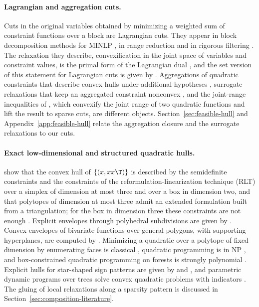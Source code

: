 \paragraph{Lagrangian and aggregation cuts.}
Cuts in the original variables obtained by minimizing a weighted sum of
constraint functions over a block are Lagrangian cuts. They appear in block
decomposition methods for MINLP \citep{Nowak2005,KaruppiahGrossmann2008,WuMutsNowakHendrix2025},
in range reduction \citep{TawarmalaniSahinidis2004,GleixnerEtAl2017} and in
rigorous filtering \citep{DomesNeumaier2016}. The relaxation they describe,
convexification in the joint space of variables and constraint values, is the
primal form of the Lagrangian dual
\citep{Falk1969,Geoffrion1974,FeltenmarkKiwiel2000,LemarechalRenaud2001}, and
the set version of this statement for Lagrangian cuts is given by
\citet{ChenLuedtke2022}. Aggregations of quadratic constraints that describe
convex hulls under additional hypotheses \citep{DeyMunozSerrano2022,BlekhermanDeySun2024},
surrogate relaxations that keep an aggregated constraint nonconvex
\citep{MullerEtAl2022}, and the joint-range inequalities of
\citet{XuPokutta2026}, which convexify the joint range of two quadratic
functions and lift the result to sparse cuts, are different objects.
Section~\ref{sec:feasible-hull} and Appendix~\ref{app:feasible-hull} relate the
aggregation closure and the surrogate relaxations to our cuts.

\paragraph{Exact low-dimensional and structured quadratic hulls.}
\citet{AnstreicherBurer2010} show that the convex hull of $\{(x,xx\T)\}$ is
described by the semidefinite constraints and the constraints of the
reformulation-linearization technique (RLT) \citep{Shor1987,SheraliAdams1990}
over a simplex of dimension at most three and over a box in dimension two,
and that polytopes of dimension at most three admit an extended formulation
built from a triangulation; for the box in dimension three these constraints
are not enough \citep{AnstreicherBurer2010,BurerLetchford2009,Anstreicher2012}.
Explicit envelopes through polyhedral subdivisions are given by
\citet{TawarmalaniRichardXiong2013}.
Convex envelopes of bivariate functions over general polygons, with
supporting hyperplanes, are computed by \citet{LocatelliSchoen2014}.
Minimizing a quadratic over a polytope of fixed dimension by enumerating
faces is classical \citep[Section~2.9]{Murty1997}, quadratic programming is in
NP \citep{Vavasis1990}, and box-constrained quadratic programming on forests
is strongly polynomial \citep{DelPiaKhajavirad2026}. Explicit hulls for
star-shaped sign patterns are given by \citet{DeyKhajavirad2025} and
\citet{Khajavirad2026}, and parametric dynamic programs over trees solve
convex quadratic problems with indicators \citep{BhathenaEtAl2025}. The
gluing of local relaxations along a sparsity pattern is discussed in
Section~\ref{sec:composition-literature}.

